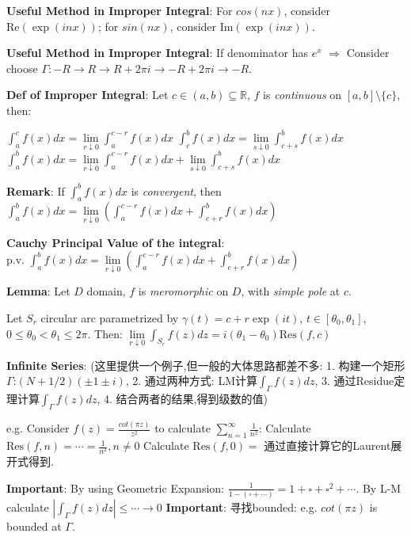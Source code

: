 \documentclass[9pt]{article}
\begin{document}
\textbf{Useful Method in Improper Integral}: {\footnotesize For $cos(nx)$, consider $\text{Re}(\exp(inx))$; \quad for $sin(nx)$, consider $\text{Im}(\exp(inx))$.} 

\textbf{Useful Method in Improper Integral}: {\footnotesize If denominator has $e^x$ $\Rightarrow$ Consider choose $\Gamma:-R\to R\to R+2\pi i\to -R+2\pi i\to -R$.} 

\textbf{Def of Improper Integral}: Let $c\in(a,b)\subseteq\mathbb{R}$, $f$ is \textit{continuous} on $[a,b]\setminus\{c\}$, then: 

\qquad $\int_{a}^{c}f(x)dx=\lim\limits_{r\downarrow 0}\int_{a}^{c-r}f(x)dx$ \quad $\int_{c}^{b}f(x)dx=\lim\limits_{s\downarrow 0}\int_{c+s}^{b}f(x)dx$ \quad $\int_{a}^{b}f(x)dx=\lim\limits_{r\downarrow 0}\int_{a}^{c-r}f(x)dx+\lim\limits_{s\downarrow 0}\int_{c+s}^{b}f(x)dx$

\vspace{-3pt}
\quad \textbf{Remark}: If $\int_{a}^{b}f(x)dx$ is \textit{convergent}, then $\int_{a}^{b}f(x)dx=\lim\limits_{r\downarrow0}\left(\int_{a}^{c-r}f(x)dx+\int_{c+r}^{b}f(x)dx\right)$

\quad \textbf{Cauchy Principal Value of the integral}: $\text{p.v. }\int_{a}^{b}f(x)dx=\lim\limits_{r\downarrow0}\left(\int_{a}^{c-r}f(x)dx+\int_{c+r}^{b}f(x)dx\right)$

\textbf{Lemma}: Let $D$ domain, $f$ is \textit{meromorphic} on $D$, with \textit{simple pole} at $c$. 

\quad Let $S_r$ circular arc parametrized by $\gamma(t)=c+r\exp(it)$, $t\in[\theta_0,\theta_1]$, $0\leq\theta_0<\theta_1\leq2\pi$. Then: $\lim\limits_{r\downarrow0}\int_{S_r}f(z)dz=i(\theta_1-\theta_0)\text{Res}(f,c)$

\textbf{Infinite Series}: {\tiny (这里提供一个例子,但一般的大体思路都差不多: 1. 构建一个矩形$\Gamma$:$(N+1/2)(\pm1\pm i)$, 2. 通过两种方式: LM计算$\int_{\Gamma}f(z)dz$, 3. 通过Residue定理计算$\int_{\Gamma}f(z)dz$, 4. 结合两者的结果,得到级数的值)}

{\scriptsize e.g. Consider $f(z)=\frac{cot(\pi z)}{z^2}$ to calculate $\sum_{n=1}^{\infty}\frac{1}{n^2}$: \qquad Calculate $\text{Res}(f,n)=\cdots=\frac{1}{n^2},n\ne0$ \qquad Calculate $\text{Res}(f,0)=$ 通过直接计算它的Laurent展开式得到.}

{\scriptsize \textbf{Important}: By using Geometric Expansion: $\frac{1}{1-(\square+\cdots)}=1+\square+\square^2+\cdots$. By L-M calculate $|\int_{\Gamma}f(z)dz|\leq\cdots\to0$ \quad \textbf{Important}: 寻找bounded: e.g. $cot(\pi z)$ is bounded at $\Gamma$.}
\end{document}
